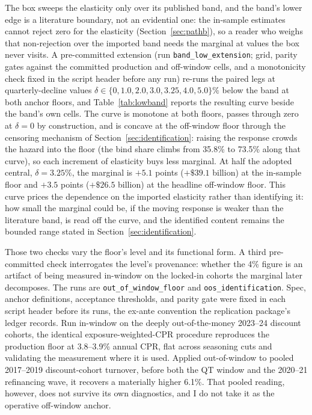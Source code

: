 \documentclass[12pt]{article}
\begin{document}
The box sweeps the elasticity only over its published band, and the band's lower edge is a literature boundary, not an evidential one: the in-sample estimates cannot reject zero for the elasticity (Section~\ref{sec:pathb}), so a reader who weighs that non-rejection over the imported band needs the marginal at values the box never visits. A pre-committed extension (run \texttt{band\_low\_extension}; grid, parity gates against the committed production and off-window cells, and a monotonicity check fixed in the script header before any run) re-runs the paired legs at quarterly-decline values $\delta \in \{0, 1.0, 2.0, 3.0, 3.25, 4.0, 5.0\}\%$ below the band at both anchor floors, and Table~\ref{tab:lowband} reports the resulting curve beside the band's own cells. The curve is monotone at both floors, passes through zero at $\delta = 0$ by construction, and is concave at the off-window floor through the censoring mechanism of Section~\ref{sec:identification}: raising the response crowds the hazard into the floor (the bind share climbs from 35.8\% to 73.5\% along that curve), so each increment of elasticity buys less marginal. At half the adopted central, $\delta = 3.25\%$, the marginal is $+5.1$ points ($+\$39.1$ billion) at the in-sample floor and $+3.5$ points ($+\$26.5$ billion) at the headline off-window floor. This curve prices the dependence on the imported elasticity rather than identifying it: how small the marginal could be, if the moving response is weaker than the literature band, is read off the curve, and the identified content remains the bounded range stated in Section~\ref{sec:identification}.


Those two checks vary the floor's level and its functional form. A third pre-committed check interrogates the level's provenance: whether the 4\% figure is an artifact of being measured in-window on the locked-in cohorts the marginal later decomposes. The runs are \texttt{out\_of\_window\_floor} and \texttt{oos\_identification}. Spec, anchor definitions, acceptance thresholds, and parity gate were fixed in each script header before its runs, the ex-ante convention the replication package's ledger records. Run in-window on the deeply out-of-the-money 2023--24 discount cohorts, the identical exposure-weighted-CPR procedure reproduces the production floor at 3.8--3.9\% annual CPR, flat across seasoning cuts and validating the measurement where it is used. Applied out-of-window to pooled 2017--2019 discount-cohort turnover, before both the QT window and the 2020--21 refinancing wave, it recovers a materially higher 6.1\%. That pooled reading, however, does not survive its own diagnostics, and I do not take it as the operative off-window anchor.
\end{document}
